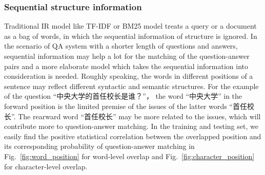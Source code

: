 \documentclass{llncs}
\begin{document}
\subsubsection{Sequential structure information}

Traditional IR model like TF-IDF or BM25 model treats a query or a document as a bag of words, in which the sequential information of structure is ignored. In the scenario of QA system with a shorter length of questions and answers, sequential information may help a lot for the matching of the question-answer pairs and a more elaborate model which takes the sequential information into consideration is needed. Roughly speaking, the words in different positions of a sentence may reflect different syntactic and semantic structures. For the example of the question ``中央大学的首任校长是谁？''， the word ``中央大学'' in the forward position is the limited premise of the issues of the latter words ``首任校长''.  The rearward word ``首任校长'' may be more related to the issues, which will contribute more to question-answer matching. In the training and testing set, we easily find the positive statistical correlation between the overlapped position and its corresponding probability of question-answer matching in Fig.~\ref{fig:word_position} for word-level overlap and Fig.~\ref{fig:character_position} for character-level overlap. 
\end{document}
